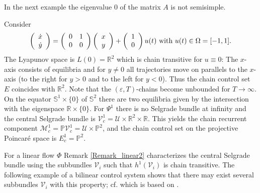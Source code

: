 	In the next example the eigenvalue $0$ of the matrix $A$ is not semisimple.
	
	\begin{example}
		\label{Example_6.11}Consider
		\[
		\left(
		\begin{array}
			[c]{c}%
			\dot{x}\\
			\dot{y}%
		\end{array}
		\right)  =\left(
		\begin{array}
			[c]{cc}%
			0 & 1\\
			0 & 0
		\end{array}
		\right)  \left(
		\begin{array}
			[c]{c}%
			x\\
			y
		\end{array}
		\right)  +\left(
		\begin{array}
			[c]{c}%
			1\\
			0
		\end{array}
		\right)  u(t)\mbox{ with }u(t)\in\Omega=[-1,1].
		\]
		The Lyapunov space is $L(0)=\mathbb{R}^{2}$ which is chain transitive for
		$u\equiv0$: The $x$-axis consists of equilibria and for $y\not =0$ all
		trajectories move on parallels to the $x$-axis (to the right for $y>0$ and to
		the left for $y<0$). Thus the chain control set $E$ coincides with
		$\mathbb{R}^{2}$. Note that the $(\varepsilon,T)$-chains become unbounded for
		$T\rightarrow\infty$. On the equator $\mathbb{S}^{1}\times\{0\}$ of
		$\mathbb{S}^{2}$ there are two equilibria given by the intersection with the
		eigenspace $\mathbb{R}\times\{0\}$. For $\Psi^{1}$ there is no Selgrade bundle
		at infinity and the central Selgrade bundle is $\mathcal{V}_{c}^{1}%
		=\mathcal{U}\times\mathbb{R}^{2}\times\mathbb{R}$. This yields the chain
		recurrent component $\mathcal{M}_{c}^{1}=\mathbb{P}\mathcal{V}_{c}%
		^{1}=\mathcal{U}\times\mathbb{P}^{2}$, and the chain control set on the
		projective Poincar\'{e} space is $E_{c}^{1}=\mathbb{P}^{2}$.
	\end{example}
	
	For a linear flow $\Phi$ Remark \ref{Remark_linear2} characterizes the central
	Selgrade bundle using the subbundles $\mathcal{V}_{i}$ such that
	$h^{1}(\mathcal{V}_{i})$ is chain transitive. The following example of a
	bilinear control system shows that there may exist several subbundles
	$\mathcal{V}_{i}$ with this property; cf. \cite[Example 5.2]{Col23} which is
	based on \cite[Example 5.5.12]{ColK00}.
	
